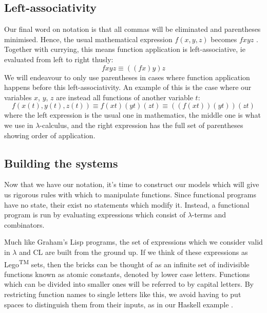 \subsection{Left-associativity}
Our final word on notation is that all commas will be eliminated and parentheses minimised. Hence, the usual mathematical expression $f(x,y,z)$ becomes $fxyz$
. Together with currying, this means function application is left-associative, ie evaluated from left to right thusly:
\begin{equation*}
    fxyz \equiv ((fx)y)z
\end{equation*}
We will endeavour to only use parentheses in cases where function application happens before this left-associativity. An example of this is the case where our variables $x$, $y$, $z$ are instead all functions of another variable $t$:
\begin{equation*}
    f(x(t),y(t),z(t)) \equiv f(xt)(yt)(zt) \equiv ((f(xt))(yt))(zt)
\end{equation*}
where the left expression is the usual one in mathematics, the middle one is what we use in $\lambda$-calculus, and the right expression has the full set of parentheses showing order of application.

\subsection{Building the systems}
Now that we have our notation, it's time to construct our models which will give us rigorous rules with which to manipulate functions. Since functional programs have no state, their exist no statements which modify it. Instead, a functional program is run by evaluating expressions which consist of $\lambda$-terms and combinators.

Much like Graham's Lisp programs, the set of expressions which we consider valid in $\lambda$ and CL are built from the ground up. If we think of these expressions as Lego\textsuperscript{TM} sets, then the bricks can be thought of as an infinite set of indivisible functions known as atomic constants, denoted by lower case letters. Functions which can be divided into smaller ones will be referred to by capital letters. By restricting function names to single letters like this, we avoid having to put spaces to distinguish them from their inputs, as in our Haskell example .

